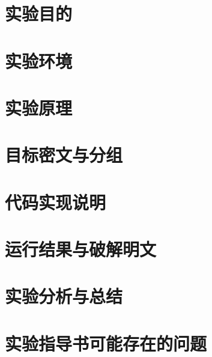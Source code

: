 \documentclass[12pt,a4paper]{article}
\begin{document}
\maketitle
\thispagestyle{fancy}
\newpage
\tableofcontents
\newpage

\section{实验目的}


\section{实验环境}


\section{实验原理}


\section{目标密文与分组}


\section{代码实现说明}


\section{运行结果与破解明文}


\section{实验分析与总结}


\section{实验指导书可能存在的问题}

\newpage

\end{document}
